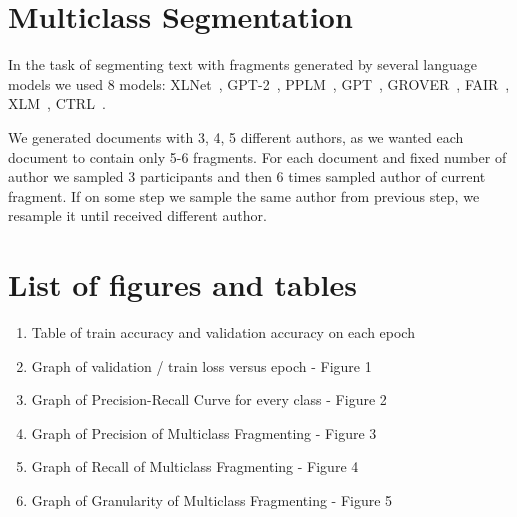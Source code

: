 \documentclass{article}
\begin{document}
\clearpage



\newpage
\appendix
\section{Multiclass Segmentation}

In the task of segmenting text with fragments generated by several language models we used 8 models: XLNet~\cite{xlnet}, GPT-2~\cite{gpt2}, PPLM~\cite{pplm}, GPT~\cite{gpt}, GROVER~\cite{grover}, FAIR~\cite{FAIR}, XLM~\cite{xlm}, CTRL~\cite{ctrl}.

We generated documents with 3, 4, 5 different authors, as we wanted each document to contain only 5-6 fragments. For each document and fixed number of author we sampled 3 participants and then 6 times sampled author of current fragment. If on some step we sample the same author from previous step, we resample it until received different author. 

\section{List of figures and tables}
\begin{enumerate}
    \item Table of train accuracy and validation accuracy on each epoch
    \item Graph of validation / train loss versus epoch - Figure 1
    \item Graph of Precision-Recall Curve for every class - Figure 2
    \item Graph of Precision of Multiclass Fragmenting - Figure 3
    \item Graph of Recall of Multiclass Fragmenting - Figure 4
    \item Graph of Granularity of Multiclass Fragmenting - Figure 5
    
\end{enumerate}
\end{document}
